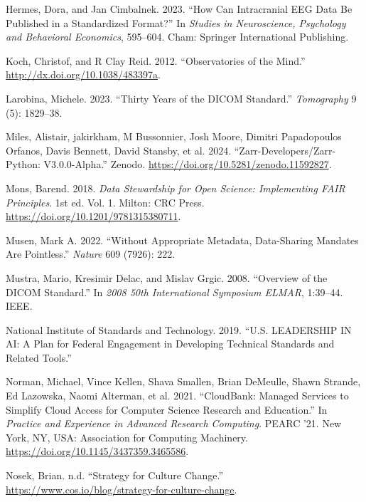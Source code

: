\documentclass[
  letterpaper,
  DIV=11,
  numbers=noendperiod]{scrartcl}
\newlength{\cslhangindent}
\newenvironment{CSLReferences}[2] %
 {\begin{list}{}{%
  \setlength{\itemindent}{0pt}
  \setlength{\leftmargin}{0pt}
  \setlength{\parsep}{0pt}
  \ifodd #1
   \setlength{\leftmargin}{\cslhangindent}
   \setlength{\itemindent}{-1\cslhangindent}
  \fi
  \setlength{\itemsep}{#2\baselineskip}}}
 {\end{list}}
\begin{document}
\begin{CSLReferences}{1}{0}
Hermes, Dora, and Jan Cimbalnek. 2023. {``How Can Intracranial {EEG}
Data Be Published in a Standardized Format?''} In \emph{Studies in
Neuroscience, Psychology and Behavioral Economics}, 595--604. Cham:
Springer International Publishing.

Koch, Christof, and R Clay Reid. 2012. {``Observatories of the Mind.''}
\url{http://dx.doi.org/10.1038/483397a}.

Larobina, Michele. 2023. {``Thirty Years of the {DICOM} Standard.''}
\emph{Tomography} 9 (5): 1829--38.

Miles, Alistair, jakirkham, M Bussonnier, Josh Moore, Dimitri
Papadopoulos Orfanos, Davis Bennett, David Stansby, et al. 2024.
{``Zarr-Developers/Zarr-Python: V3.0.0-Alpha.''} Zenodo.
\url{https://doi.org/10.5281/zenodo.11592827}.

Mons, Barend. 2018. \emph{Data Stewardship for Open Science:
Implementing FAIR Principles}. 1st ed. Vol. 1. Milton: CRC Press.
\url{https://doi.org/10.1201/9781315380711}.

Musen, Mark A. 2022. {``Without Appropriate Metadata, Data-Sharing
Mandates Are Pointless.''} \emph{Nature} 609 (7926): 222.

Mustra, Mario, Kresimir Delac, and Mislav Grgic. 2008. {``Overview of
the {DICOM} Standard.''} In \emph{2008 50th International Symposium
ELMAR}, 1:39--44. IEEE.

National Institute of Standards and Technology. 2019. {``{U.S}.
{LEADERSHIP} {IN} {AI}: A Plan for Federal Engagement in Developing
Technical Standards and Related Tools.''}

Norman, Michael, Vince Kellen, Shava Smallen, Brian DeMeulle, Shawn
Strande, Ed Lazowska, Naomi Alterman, et al. 2021. {``{CloudBank:
Managed Services to Simplify Cloud Access for Computer Science Research
and Education}.''} In \emph{Practice and Experience in Advanced Research
Computing}. PEARC '21. New York, NY, USA: Association for Computing
Machinery. \url{https://doi.org/10.1145/3437359.3465586}.

Nosek, Brian. n.d. {``Strategy for Culture Change.''}
\url{https://www.cos.io/blog/strategy-for-culture-change}.


\end{CSLReferences}
\end{document}

